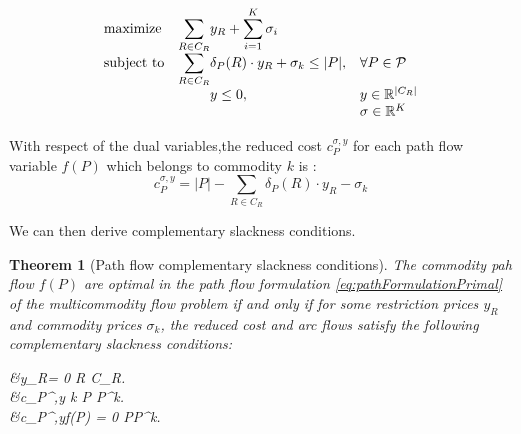 \documentclass[14pt,a4paper]{article}
\newtheorem{theorem}{Theorem}[section]
\theoremstyle{definition}
\numberwithin{equation}{subsection}
\begin{document}
\begin{equation}
\begin{array}{ll@{}lll}
\text{maximize}  &\displaystyle\sum\limits_{R \in C_R} &y_R  +\displaystyle\sum\limits_{i=1}^{K}\sigma_i &\\
\text{subject to}  & \displaystyle\sum\limits_{R \in C_R}   &\delta_P(R)\cdot y_R + \sigma_k \leq |P|,  &\forall P \in \mathcal{P}\\
 &                                               &y \leq 0, &y \in \mathbb{R}^{|C_R|} \\
 &												 & &\sigma \in \mathbb{R}^K\\
\end{array}
\label{eq:pathFormulationDual}
\end{equation}




With respect of the dual variables,the reduced cost $c_P^{\sigma,y}$ for each path flow variable $f(P)$ which belongs to commodity $k$ is :
\begin{equation}
 c_P^{\sigma,y} = |P| - \sum\limits_{R \in C_R}   \delta_P(R)\cdot y_R -\sigma_k
\label{eq:reducedCost}
\end{equation}


We can then derive complementary slackness conditions.

\begin{theorem}[Path flow complementary slackness conditions]
	The commodity pah flow $f(P)$ are optimal in the path flow formulation \eqref{eq:pathFormulationPrimal} of the multicommodity flow problem if and only if for some restriction prices $y_R$ and commodity prices $\sigma_k$, the reduced cost and arc flows satisfy the following complementary slackness conditions: 
	\begin{flalign}
	&y_R= 0  R \in C_R. \label{eq:cond1}\\
	&c_P^{\sigma,y}   k \in [K] P \in P^k. \label{eq:cond2}\\
	&c_P^{\sigma,y}\cdot f(P) = 0  \in [K]  P\in P^k. \label{eq:cond3}
	\end{flalign}
	\label{theorem:slackcond}
\end{theorem}
\end{document}
